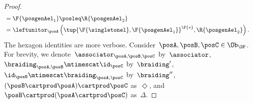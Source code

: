 \begin{proof}
\begin{equation}
\begin{aligned}
             & =\F{\posgenAel_1}\posleq \R{\posgenAel_2}                                                                                                                                                                                                                                                                                    \\
             & =\leftunitor_\posA\left( \tup{\F{\singletonel},\F{\posgenAel_1}}^\F{*},\R{\posgenAel_2}\right).                                                                                                                                                                                                                              
        \end{aligned}
    \end{equation}
    The hexagon identities are more verbose.
    Consider~$\posA,\posB,\posC\in \Ob_\DP$.
    For brevity, we denote~$\associator_{\posA,\posB,\posC}$ by~$\associator$,~$\braiding_{\posA,\posB}\mtimescat \id_\posC$ by~$\braiding'$,~$\id_\posB \mtimescat \braiding_{\posA,\posC}$ by~$\braiding''$,~$(\posB\cartprod \posA)\cartprod \posC$ as~$\Diamond$, and~$\posB\cartprod (\posA\cartprod \posC)$ as~$\Delta$.


\end{proof}
